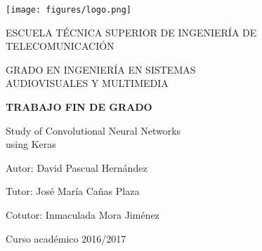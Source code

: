 \begin{titlepage}
	
	\begin{center}
		\vspace*{7.7mm}
		\begin{center}
			\texttt{[image: figures/logo.png]}
		\end{center}
		\vspace{6.5mm}
		
		\fontsize{15.5}{14}\selectfont ESCUELA TÉCNICA SUPERIOR DE INGENIERÍA DE TELECOMUNICACIÓN
		\vspace{13mm}
		
		\fontsize{14}{14}\selectfont GRADO EN INGENIERÍA EN SISTEMAS \\ AUDIOVISUALES Y MULTIMEDIA

		\vspace{70pt}
		
		\fontsize{15.7}{14}\selectfont \textbf{TRABAJO FIN DE GRADO} 
		
		\vspace{25mm}
		\begin{huge}
			 Study of Convolutional Neural Networks\\ using Keras
		\end{huge}
		
		\vspace{25mm}
		
		\begin{large}
			Autor: David Pascual Hernández
			
			Tutor: José María Cañas Plaza
			
			Cotutor: Inmaculada Mora Jiménez 
			
			\vspace{10mm}
		\end{large}
		\begin{normalsize}
			Curso académico 2016/2017		
		\end{normalsize}
		\vspace{10mm}
		
	\end{center}
	
\end{titlepage}

\pagebreak
\thispagestyle{empty}
\vspace*{12cm}

